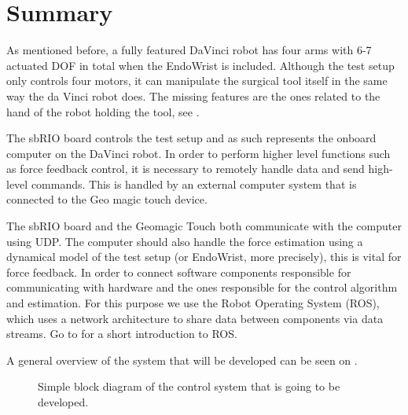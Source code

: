 \section{Summary}
As mentioned before, a fully featured DaVinci robot has four arms with 6-7 actuated \gls{DOF} in total when the EndoWrist is included.
Although the test setup only controls four motors, it can manipulate the surgical tool itself in the same way the da Vinci robot does. The missing features are the ones related to the hand of the robot holding the tool, see .

The sbRIO board controls the test setup and as such represents the onboard computer on the DaVinci robot.
In order to perform higher level functions such as force feedback control, it is necessary to remotely handle data and send high-level commands.
This is handled by an external computer system that is connected to the Geo magic touch device.

The sbRIO board and the Geomagic Touch both communicate with the computer using UDP. The computer should also handle the force estimation using a dynamical model of the test setup (or EndoWrist, more precisely), this is vital for force feedback.
In order to connect software components responsible for communicating with hardware and the ones responsible for the control algorithm and estimation.
For this purpose we use the Robot Operating System (ROS), which uses a network architecture to share data between components via data streams. Go to  for a short introduction to ROS.

A general overview of the system that will be developed can be seen on .

\begin{figure}

\caption{Simple block diagram of the control system that is going to be developed.}
\label{sec:summering_model}
\end{figure}


